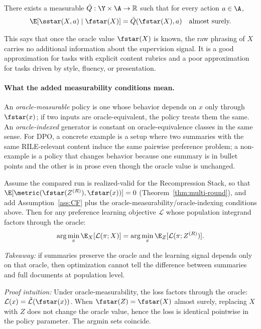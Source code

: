 \begin{assumption}\label{ass:CF}
There exists a measurable $\bar{Q}: \Y \times \A \to \mathbb{R}$ such that for every action $a \in \A$,
\[
\E\!\left[\sstar(X, a) \mid \fstar(X)\right] = \bar{Q}(\fstar(X), a) \quad \text{almost surely.}
\]
\end{assumption}

This says that once the oracle value $\fstar(X)$ is known, the raw phrasing of $X$ carries no additional information about the supervision signal. It is a good approximation for tasks with explicit content rubrics and a poor approximation for tasks driven by style, fluency, or presentation.

\paragraph{What the added measurability conditions mean.}
An \emph{oracle-measurable} policy is one whose behavior depends on $x$ only through $\fstar(x)$; if two inputs are oracle-equivalent, the policy treats them the same. An \emph{oracle-indexed} generator is constant on oracle-equivalence classes in the same sense. For DPO, a concrete example is a setup where two summaries with the same RILE-relevant content induce the same pairwise preference problem; a non-example is a policy that changes behavior because one summary is in bullet points and the other is in prose even though the oracle value is unchanged.

\begin{theorem}\label{thm:pref-equiv}
Assume the compared run is realized-valid for the Recompression Stack, so that $\E[\metric(\fstar(Z^{(R)}), \fstar(x))] = 0$ (Theorem~\ref{thm:multi-round}), and add Assumption~\ref{ass:CF} plus the oracle-measurability/oracle-indexing conditions above. Then for any preference learning objective $\mathcal{L}$ whose population integrand factors through the oracle:
\[
\arg\min_\pi \E_X[\mathcal{L}(\pi; X)] = \arg\min_\pi \E_Z[\mathcal{L}(\pi; Z^{(R)})].
\]
\end{theorem}

\noindent\textit{Takeaway:} if summaries preserve the oracle and the learning signal depends only on that oracle, then optimization cannot tell the difference between summaries and full documents at population level.

\noindent\textit{Proof intuition:} Under oracle-measurability, the loss factors through the oracle: $\mathcal{L}(x) = \tilde{\mathcal{L}}(\fstar(x))$. When $\fstar(Z) = \fstar(X)$ almost surely, replacing $X$ with $Z$ does not change the oracle value, hence the loss is identical pointwise in the policy parameter. The argmin sets coincide.

